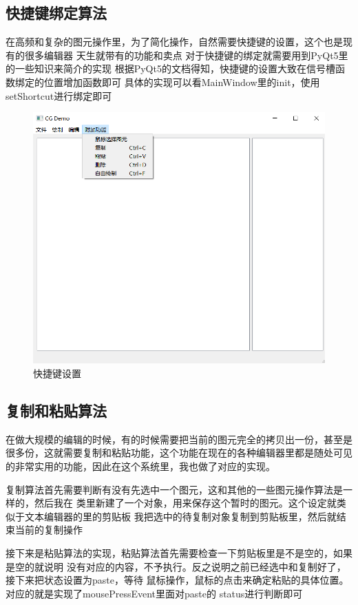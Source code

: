 \documentclass[a4paper,UTF8]{article}
\theoremstyle{definition}
\begin{document}
\subsection{快捷键绑定算法}
在高频和复杂的图元操作里，为了简化操作，自然需要快捷键的设置，这个也是现有的很多编辑器
天生就带有的功能和卖点
对于快捷键的绑定就需要用到PyQt5里的一些知识来简介的实现
根据PyQt5的文档得知，快捷键的设置大致在信号槽函数绑定的位置增加函数即可
具体的实现可以看MainWindow里的init，使用setShortcut进行绑定即可
\begin{figure}[htb]
	\centering
	\includegraphics[scale=0.4]{figure/shortcut.png}
	\caption{快捷键设置}
	\label{fig:shortcut}
\end{figure}

\subsection{复制和粘贴算法}
在做大规模的编辑的时候，有的时候需要把当前的图元完全的拷贝出一份，甚至是
很多份，这就需要复制和粘贴功能，这个功能在现在的各种编辑器里都是随处可见
的非常实用的功能，因此在这个系统里，我也做了对应的实现。

复制算法首先需要判断有没有先选中一个图元，这和其他的一些图元操作算法是一样的，然后我在
类里新建了一个对象，用来保存这个暂时的图元。这个设定就类似于文本编辑器的里的剪贴板
我把选中的待复制对象复制到剪贴板里，然后就结束当前的复制操作

接下来是粘贴算法的实现，粘贴算法首先需要检查一下剪贴板里是不是空的，如果是空的就说明
没有对应的内容，不予执行。反之说明之前已经选中和复制好了，接下来把状态设置为paste，等待
鼠标操作，鼠标的点击来确定粘贴的具体位置。对应的就是实现了mousePressEvent里面对paste的
status进行判断即可
\end{document}
